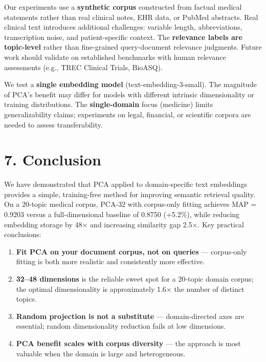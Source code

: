 \documentclass[
  11pt,
  letterpaper,
]{article}
\providecommand{\tightlist}{%
  \setlength{\itemsep}{0pt}\setlength{\parskip}{0pt}}
\begin{document}
Our experiments use a \textbf{synthetic corpus} constructed from factual
medical statements rather than real clinical notes, EHR data, or PubMed
abstracts. Real clinical text introduces additional challenges: variable
length, abbreviations, transcription noise, and patient-specific
context. The \textbf{relevance labels are topic-level} rather than
fine-grained query-document relevance judgments. Future work should
validate on established benchmarks with human relevance assessments
(e.g., TREC Clinical Trials, BioASQ).

We test a \textbf{single embedding model} (text-embedding-3-small). The
magnitude of PCA's benefit may differ for models with different
intrinsic dimensionality or training distributions. The
\textbf{single-domain} focus (medicine) limits generalizability claims;
experiments on legal, financial, or scientific corpora are needed to
assess transferability.

\section{7. Conclusion}\label{conclusion}

We have demonstrated that PCA applied to domain-specific text embeddings
provides a simple, training-free method for improving semantic retrieval
quality. On a 20-topic medical corpus, PCA-32 with corpus-only fitting
achieves MAP = 0.9203 versus a full-dimensional baseline of 0.8750
(+5.2\%), while reducing embedding storage by 48× and increasing
similarity gap 2.5×. Key practical conclusions:

\begin{enumerate}
\def\labelenumi{\arabic{enumi}.}
\tightlist
\item
  \textbf{Fit PCA on your document corpus, not on queries} ---
  corpus-only fitting is both more realistic and consistently more
  effective.
\item
  \textbf{32--48 dimensions} is the reliable sweet spot for a 20-topic
  domain corpus; the optimal dimensionality is approximately 1.6× the
  number of distinct topics.
\item
  \textbf{Random projection is not a substitute} --- domain-directed
  axes are essential; random dimensionality reduction fails at low
  dimensions.
\item
  \textbf{PCA benefit scales with corpus diversity} --- the approach is
  most valuable when the domain is large and heterogeneous.
\end{enumerate}
\end{document}
